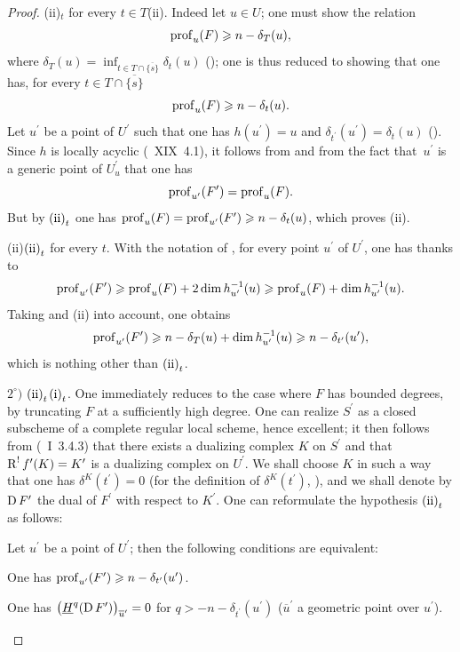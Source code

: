 \begin{proof}
\textup{(ii)}$_{t}$ for every $t\in T$\ALORS\textup{(ii)}. Indeed let $u\in U$; one must show the relation
$$
\operatorname{prof}_{u}(F)\geqslant n-\delta_{T}(u),
$$
where $\delta_{T}(u)=\inf_{t\in T\cap\overline{\{ s\} }}\delta_{t}(u)$ (\cf {}); one is thus reduced to showing that one has, for every $t\in T\cap\overline{\{ s\} }$
$$
\operatorname{prof}_{u}(F)\geqslant n-\delta_{t}(u).
$$
Let $u^{\prime}$ be a point of $U^{\prime}$ such that one has $h(u^{\prime})=u$ and $\delta_{t^{\prime}}(u^{\prime})=\delta_{t}(u)$ (\cf {}). Since $h$ is locally acyclic (~XIX~4.1), it follows from  and from the fact that~$u^{\prime}$ is a generic point of $U_{u}^{\prime}$ that one has
$$
\operatorname{prof}_{u^{\prime}}(F^{\prime})=\operatorname{prof}_{u}(F).
$$
But by $\textup{(ii)}_{t}$ one has $\operatorname{prof}_{u}(F)=\operatorname{prof}_{u^{\prime}}(F^{\prime})\geqslant n-\delta_{t}(u)$, which proves \textup{(ii)}.

\textup{(ii)}\ALORS$\textup{(ii)}_{t}$ for every $t$. With the notation of , for every point $u^{\prime}$ of $U^{\prime}$, one has thanks to 
$$
\operatorname{prof}_{u^{\prime}}(F^{\prime})\geqslant\operatorname{prof}_{u}(F)+2\dim h_{u^{\prime}}^{-1}(u)\geqslant\operatorname{prof}_{u}(F)+\dim h_{u^{\prime}}^{-1}(u).
$$
Taking  and \textup{(ii)} into account, one obtains
$$
\operatorname{prof}_{u^{\prime}}(F^{\prime})\geqslant n-\delta_{T}(u)+\dim h_{u^{\prime}}^{-1}(u)\geqslant n-\delta_{t^{\prime}}(u^{\prime}),
$$
which is nothing other than $\textup{(ii)}_{t}$.

$2^\circ)$ $\textup{(ii)}_{t}$\SSI$\textup{(i)}_{t}$. One immediately reduces to the case where $F$ has bounded degrees, by truncating $F$ at a sufficiently high degree. One can realize $S^{\prime}$ as a closed subscheme of a complete regular local scheme, hence excellent; it then follows from (~I~3.4.3) that there exists a dualizing complex $K$ on $S^{\prime}$ and that $\operatorname{R}^{!}f^{\prime}(K)=K^{\prime}$ is a dualizing complex on $U^{\prime}$. We shall choose $K$ in such a way that one has $\delta^{K}(t^{\prime})=0$ (for the definition of $\delta^{K}(t^{\prime})$, \cf {}), and we shall denote by $\operatorname{D} F^{\prime}$ the dual of $F^{\prime}$ with respect to $K^{\prime}$. One can reformulate the hypothesis $\textup{(ii)}_{t}$ as follows:

\begin{sublemma} \label{XIV.4.2.2}
Let $u^{\prime}$ be a point of $U^{\prime}$; then the following conditions are equivalent:
\begin{enumeratei}
\item
One has $\operatorname{prof}_{u^{\prime}}(F^{\prime})\geqslant n-\delta_{t^{\prime}}(u^{\prime})$.
\item
One has $\big(\underline{H}^{q}(\operatorname{D} F^{\prime}) \big)_{\overline{u}^{\prime}}=0$ for $q>-n-\delta_{t^{\prime}}(u^{\prime})$ ($\overline{u}^{\prime}$ a geometric point over $u^{\prime}$).
\end{enumeratei}
\end{sublemma}


\end{proof}
